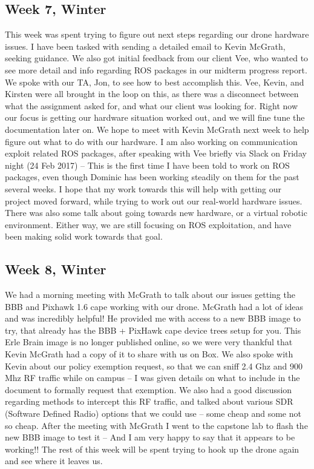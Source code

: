 \documentclass[IEEEtran,letterpaper,10pt,notitlepage,draftclsnofoot,onecolumn]{article}
\begin{document}
\begin{sloppypar}
\subsection{Week 7, Winter}
This week was spent trying to figure out next steps regarding our drone hardware issues. I have been tasked with sending a detailed email to Kevin McGrath, seeking guidance. We also got initial feedback from our client Vee, who wanted to see more detail and info regarding ROS packages in our midterm progress report. We spoke with our TA, Jon, to see how to best accomplish this. Vee, Kevin, and Kirsten were all brought in the loop on this, as there was a disconnect between what the assignment asked for, and what our client was looking for. Right now our focus is getting our hardware situation worked out, and we will fine tune the documentation later on. We hope to meet with Kevin McGrath next week to help figure out what to do with our hardware.                            I am also working on communication exploit related ROS packages, after speaking with Vee briefly via Slack on Friday night (24 Feb 2017) -- This is the first time I have been told to work on ROS packages, even though Dominic has been working steadily on them for the past several weeks. I hope that my work towards this will help with getting our project moved forward, while trying to work out our real-world hardware issues.
There was also some talk about going towards new hardware, or a virtual robotic environment. Either way, we are still focusing on ROS exploitation, and have been making solid work towards that goal.
\subsection{Week 8, Winter}
We had a morning meeting with McGrath to talk about our issues getting the BBB and Pixhawk 1.6 cape working with our drone. McGrath had a lot of ideas and was incredibly helpful! He provided me with access to a new BBB image to try, that already has the BBB + PixHawk cape device trees setup for you. This Erle Brain image is no longer published online, so we were very thankful that Kevin McGrath had a copy of it to share with us on Box. We also spoke with Kevin about our policy exemption request, so that we can sniff 2.4 Ghz and 900 Mhz RF traffic while on campus -- I was given details on what to include in the document to formally request that exemption. We also had a good discussion regarding methods to intercept this RF traffic, and talked about various SDR (Software Defined Radio) options that we could use -- some cheap and some not so cheap.
After the meeting with McGrath I went to the capstone lab to flash the new BBB image to test it -- And I am very happy to say that it appears to be working!! The rest of this week will be spent trying to hook up the drone again and see where it leaves us.

\end{sloppypar}
\end{document}
